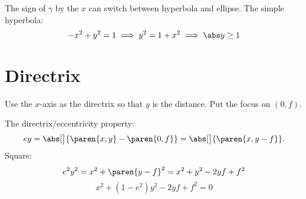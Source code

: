 \documentclass{scrartcl}
\begin{document}
The sign of \(\gamma\) by the \(x\) can switch between hyperbola and ellipse. The simple hyperbola:
\[
  -x^2+ y^2 = 1 \implies y^2 = 1+x^2 \implies \abs y \geq 1
\]
\section{Directrix}
Use the \(x\)-axis as the directrix so that \(y\) is the distance. Put the focus on \((0,f)\).

The directrix/eccentricity property:
\[
  ey = \abs[\big]{\paren{x,y} - \paren{0,f}} = \abs[\big]{\paren{x,y-f}}.
\]
Square:
\[
  e^2y^2 = {x^2 + \paren{y-f}^2} = {x^2 + y^2 -2yf + f^2}
\]
\[
  x^2 + (1-e^2)y^2 - 2yf + f^2 = 0
\]
\end{document}
